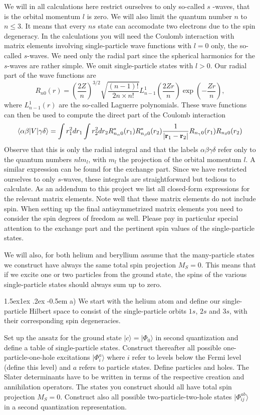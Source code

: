 \documentclass[%
oneside,                 %
final,                   %
10pt]{article}
\makeatletter
\newenvironment{doconceexercise}{}{}
\newcommand\subex{\@startsection{paragraph}{4}{\z@}%
                  {1.5ex\@plus1ex \@minus.2ex}%
                  {-0.5em}%
                  {\normalfont\normalsize\bfseries}}
\makeatother
\begin{document}
\begin{doconceexercise}
We will in all calculations here restrict ourselves to only so-called $s$ -waves,
that is the orbital momentum $l$ is zero. We will also limit the quantum number $n$ to $n\le 3$.  It means that every $ns$ state can accomodate two electrons due to the spin degeneracy. 
In the calculations you 
will need the Coulomb interaction with matrix elements
involving single-particle wave functions with $l=0$ only, the so-called $s$-waves.
We need only the radial part since the 
spherical harmonics for the $s$-waves are rather simple. We omit single-particle states with $l> 0$.
Our radial part of the wave functions are
\[
R_{n0}(r)=\left(\frac{2Z}{n}\right)^{3/2}\sqrt{\frac{(n-1)!}{2n\times n!}}L_{n-1}^1(\frac{2Zr}{n})\exp{(-\frac{Zr}{n})},
\]
where $L_{n-1}^1(r)$ are the so-called Laguerre polynomials.
These wave functions can then be used to compute the direct part of the
Coulomb interaction
\[
\langle \alpha\beta| V| \gamma\delta\rangle = \int r_1^2dr_1 \int r_2^2dr_2R_{n_{\alpha}0}^*(r_1) R_{n_{\beta}0}^*(r_2) 
  \frac{1}{| {\bf r}_1-{\bf r}_2|}R_{n_{\gamma}0}(r_1)R_{n_{\delta}0}(r_2)
\]
Observe that this is only the radial integral and that the labels $\alpha\beta\gamma\delta$ refer only to the quantum numbers $nlm_l$, with $m_l$ the projection of the orbital momentum $l$. 
A similar expression can be found for the exchange part. Since we have restricted ourselves to only $s$-waves, these integrals are straightforward but tedious to calculate. As an addendum to this project we list all closed-form expressions for the relevant matrix elements. Note well that these matrix elements do not include spin. When setting up the final antisymmetrized matrix elements you need to consider the spin degrees of freedom as well. Please pay in particular special attention to the exchange part and the pertinent spin values of the single-particle states.


We will also, for both helium and beryllium assume that the many-particle states we construct have always the same total spin projection $M_S=0$. This means that if we excite one or two particles from the ground state, the spins of the various single-particle states should always sum up to zero.


\subex{a)}
We start with the helium atom and define our single-particle Hilbert space to consist of the single-particle orbits $1s$, $2s$ and $3s$, with their corresponding spin degeneracies.

Set up the ansatz for the ground state $|c\rangle = |\Phi_0\rangle$ in second 
quantization and define a table of single-particle states. Construct thereafter
all possible one-particle-one-hole excitations  $|\Phi_i^a\rangle$ where $i$ refer to levels below the Fermi level (define this level) and $a$ refers to particle states. Define particles and holes. The Slater determinants have to be written in terms of the respective creation and annihilation operators.
The states you construct should all have total spin projection $M_S=0$. 
Construct also all possible two-particle-two-hole states $|\Phi_{ij}^{ab}\rangle$  in a second quantization representation.


\end{doconceexercise}
\end{document}
